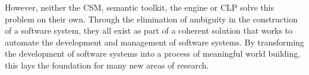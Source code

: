 However, neither the CSM, semantic toolkit, the engine or CLP solve this problem on their own. Through the elimination of ambiguity in the construction of a software system, they all exist as part of a coherent solution that works to automate the development and management of software systems. By transforming the development of software systems into a process of meaningful world building, this lays the foundation for many new areas of research.

